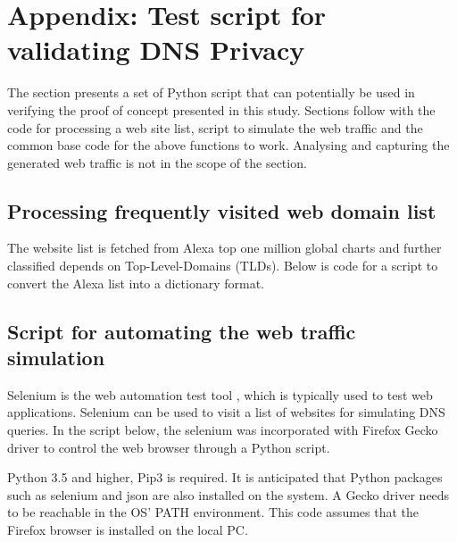 \documentclass[a4paper,12pt]{article}
\begin{document}
%
\newpage

\hypersetup{urlcolor=black}


\newpage
\setcounter{page}{1} %
\appendix

\section{Appendix: Test script for validating DNS Privacy}\label{scriptcode-appendix}
The section presents a set of Python script that can potentially be used in verifying the proof of concept presented in this study.
Sections follow with the code for processing a web site list, script to simulate the web traffic and the common base code for the above functions to work.
Analysing and capturing the generated web traffic is not in the scope of the section.

\subsection{Processing frequently visited web domain list} \label{processweblist}
The website list is fetched from Alexa top one million global charts and further classified depends on Top-Level-Domains (TLDs).
Below is code for a script to convert the Alexa list into a dictionary format.

\subsection{Script for automating the web traffic simulation}
Selenium is the web automation test tool \cite{holmes2006automating}, which is typically used to test web applications. Selenium can be used to visit a list of websites for simulating DNS queries. In the script below, the selenium was incorporated with Firefox Gecko driver to control the web browser through a Python script.

Python 3.5 and higher, Pip3 is required. It is anticipated that Python packages such as selenium and json are also installed on the system. A Gecko driver needs to be reachable in the OS' PATH environment. This code assumes that the Firefox browser is installed on the local PC.
\end{document}
